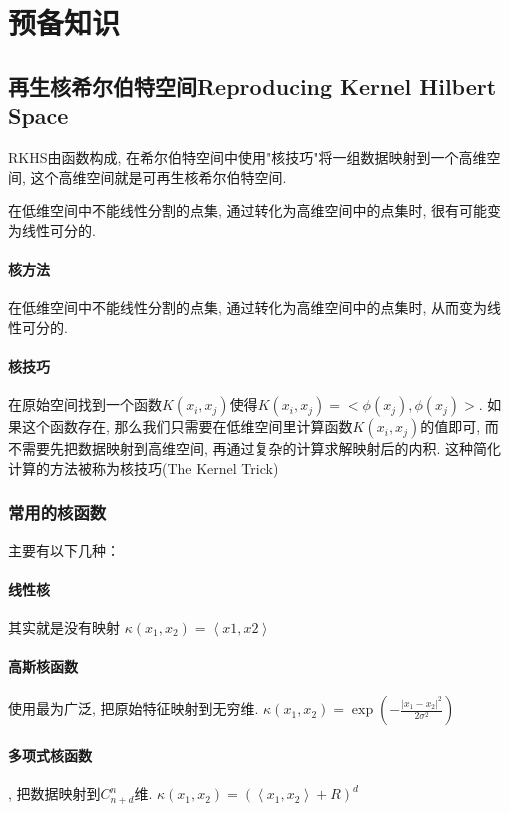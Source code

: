 \section{预备知识}

\subsection{再生核希尔伯特空间Reproducing Kernel Hilbert Space}
RKHS由函数构成, 在希尔伯特空间中使用"核技巧"将一组数据映射到一个高维空间, 这个高维空间就是可再生核希尔伯特空间. 

在低维空间中不能线性分割的点集, 通过转化为高维空间中的点集时, 很有可能变为线性可分的.

\paragraph{核方法}
在低维空间中不能线性分割的点集, 通过转化为高维空间中的点集时, 从而变为线性可分的.
\paragraph{核技巧}
在原始空间找到一个函数$K(x_i,x_j)$使得$K(x_i,x_j) = <\phi(x_j),\phi(x_j)>$.
如果这个函数存在, 那么我们只需要在低维空间里计算函数$K(x_i,x_j)$的值即可, 而不需要先把数据映射到高维空间, 再通过复杂的计算求解映射后的内积. 这种简化计算的方法被称为核技巧(The Kernel Trick)

\subsubsection{常用的核函数}

主要有以下几种：

\paragraph{线性核} 其实就是没有映射 $\kappa \left ( x_{1},x_{2} \right ) = \left \langle x{1},x{2} \right \rangle$

\paragraph{高斯核函数}使用最为广泛, 把原始特征映射到无穷维.
 $\kappa \left ( x_{1},x_{2} \right ) = \exp \left ( -\frac{\left | x_{1}-x_{2} \right |^{2}}{2\sigma ^{2}} \right )$

 \paragraph{多项式核函数}, 把数据映射到$C_{n+d}^{n}$维.
$\kappa \left ( x_{1},x_{2} \right ) = \left ( \left \langle x_{1},x_{2} \right \rangle  +R\right )^{d}$


